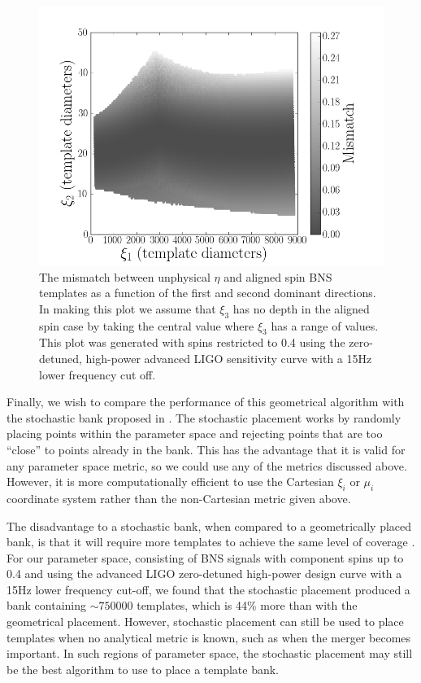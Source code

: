 \begin{figure}
\begin{center}
\includegraphics[width=1.0\textwidth]{papers/bns_spin/figure9.png} 
\end{center}
\caption{\label{fig:unphys_eta} The mismatch between unphysical $\eta$ and
aligned spin BNS templates as a function of the first and second dominant
directions. In making this plot we assume that $\xi_3$
has no depth in the aligned spin case by taking the central value where $\xi_3$ has a range of values.
This plot was generated
with spins restricted to 0.4 using the zero-detuned, high-power advanced LIGO
sensitivity curve with a 15Hz lower frequency cut off. 
}
\end{figure}

Finally, we wish to compare the performance of this geometrical algorithm with the stochastic bank proposed in
\cite{Harry:2009ea,Babak:2008rb}. The stochastic placement works by randomly placing points within the parameter
space and rejecting points that are too ``close'' to points already in the bank. This
has the advantage that it is valid for any parameter space metric, so we could use any of the metrics discussed
above. However, it is more computationally efficient to use the Cartesian $\xi_i$ or $\mu_i$ coordinate system
rather than the non-Cartesian metric given above.

The disadvantage to a stochastic bank, when compared to a geometrically placed bank, is that it will require more
templates to achieve the same level of coverage \cite{Harry:2009ea,Manca:2009xw}.
For our parameter space, consisting of BNS signals with
component spins up to 0.4 and using the advanced LIGO zero-detuned high-power design curve with a 15Hz lower
frequency cut-off,
we found that the stochastic placement
produced a bank containing $\sim 750000$ templates, which is 44\% more than with the geometrical placement.
However, stochastic placement can still be used to place templates when no analytical metric is known, such
as when the merger becomes important. In such regions of parameter space, the stochastic placement may still be the best
algorithm to use to place a template bank.

